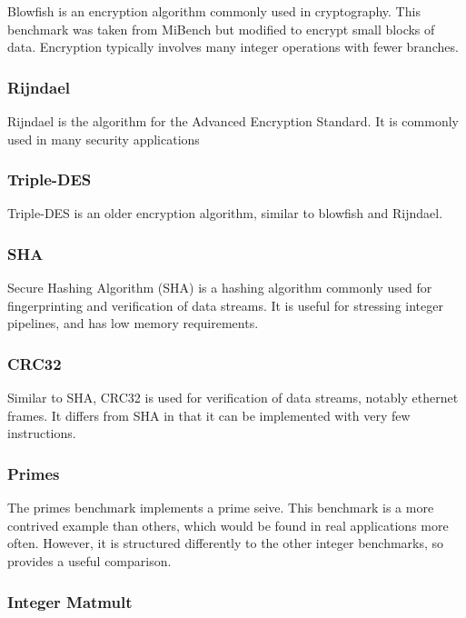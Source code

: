 \documentclass[twocolumn]{article}
\begin{document}
Blowfish is an encryption algorithm commonly used in cryptography. This benchmark was taken from MiBench but modified to encrypt small blocks of data. Encryption typically involves many integer operations with fewer branches.

\subsubsection*{Rijndael}

Rijndael is the algorithm for the Advanced Encryption Standard. It is commonly used in many security applications

\subsubsection*{Triple-DES}
Triple-DES is an older encryption algorithm, similar to blowfish and Rijndael.

\subsubsection*{SHA}

Secure Hashing Algorithm (SHA) is a hashing algorithm commonly used for fingerprinting and verification of data streams. It is useful for stressing integer pipelines, and has low memory requirements.

\subsubsection*{CRC32}

Similar to SHA, CRC32 is used for verification of data streams, notably ethernet frames. It differs from SHA in that it can be implemented with very few instructions.

\subsubsection*{Primes}

The primes benchmark implements a prime seive. This benchmark is a more contrived example than others, which would be found in real applications more often. However, it is structured differently to the other integer benchmarks, so provides a useful comparison.

\subsubsection*{Integer Matmult}
\end{document}
